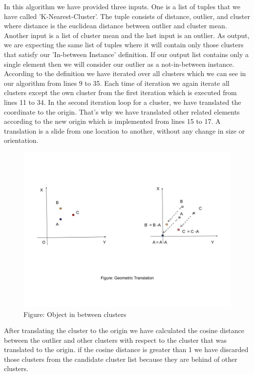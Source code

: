 \documentclass[11pt]{article}
\theoremstyle{definition}
\begin{document}
\newpage
\noindent In this algorithm we have provided three inputs. One is a list of tuples that we have called 'K-Nearest-Cluster'. The tuple consists of distance, outlier, and cluster where distance is the euclidean distance between outlier and cluster mean. Another input is a list of cluster mean and the last input is an outlier. As output, we are expecting the same list of tuples where it will contain only those clusters that satisfy our 'In-between Instance' definition. If our output list contains only a single element then we will consider our outlier as a not-in-between instance.\\

\noindent According to the definition we have iterated over all clusters which we can see in our algorithm from lines 9 to 35. Each time of iteration we again iterate all clusters except the own cluster from the first iteration which is executed from lines 11 to 34. In the second iteration loop for a cluster, we have translated the coordinate to the origin. That's why we have translated other related elements according to the new origin which is implemented from lines 15 to 17.  A translation is a slide from one location to another, without any change in size or orientation.
\begin{figure}[H]
\centering
\includegraphics[scale=.4]{images/Geometric-translation.jpg}\\
Figure: Object in between clusters
\end{figure}
\noindent After translating the cluster to the origin we  have calculated the cosine distance between the outlier and other clusters with respect to the cluster that was translated to the origin. if the cosine distance is greater than 1 we have discarded those clusters from the candidate cluster list because they are behind of other clusters.
\end{document}
